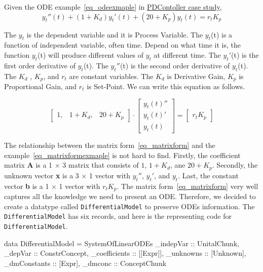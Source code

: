 Given the ODE example~\ref{eq_odeexmaple} in \href{https://jacquescarette.github.io/Drasil/examples/pdcontroller/SRS/srs/PDController_SRS.html}{PDContoller case study},
\begin{equation} \label{eq_odeexmaple}
	y_t''(t) + (1 + K_d)y_t'(t) + (20 + K_p)y_t(t) = r_t K_p
\end{equation}

The $y_t$ is the dependent variable and it is Process Variable. The $y_t$(t) is a function of independent variable, often time. Depend on what time it is, the function $y_t$(t) will produce different values of $y_t$ at different time. The $y_t'$(t) is the first order derivative of $y_t$(t). The $y_t''$(t) is the second order derivative of $y_t$(t). The $K_d$ , $K_p$, and $r_t$ are constant variables. The $K_d$ is Derivative Gain, $K_p$ is Proportional Gain, and $r_t$ is Set-Point. We can write this equation as follows. 

\begin{equation} \label{eq_matrixformexmaple}
	\begin{bmatrix}
		1, & 1 + K_{d}, & 20 + K_{p}
	\end{bmatrix}
	\cdot
	\begin{bmatrix}
		y_{t}(t)''  \\
		y_{t}(t)'   \\
		y_{t}(t)  
	\end{bmatrix}
	=
	\begin{bmatrix}
		r_{t} K_{p} 
	\end{bmatrix}
\end{equation}

The relationship between the matrix form~\ref{eq_matrixform} and the example~\ref{eq_matrixformexmaple} is not hard to find. Firstly, the coefficient matrix \textbf{A} is a 1 $\times$ 3 matrix that consists of $1$, $1 + K_d$, ane $20 + K_p$. Secondly, the unknown vector \textbf{x} is a 3 $\times$ 1 vector with $y_t''$, $y_t'$, and $y_t$. Last, the constant vector \textbf{b} is a 1 $\times$ 1 vector with $r_t K_p$. The matrix form~\ref{eq_matrixform} very well captures all the knowledge we need to present an ODE. Therefore, we decided to create a datatype called \verb|DifferentialModel| to preserve ODEs information. The \verb|DifferentialModel| has six records, and here is the representing code for \verb|DifferentialModel|.
\begin{haskell1}
data DifferentialModel = SystemOfLinearODEs {
	_indepVar :: UnitalChunk,
	_depVar :: ConstrConcept,
	_coefficients :: [[Expr]],
	_unknowns :: [Unknown],
	_dmConstants :: [Expr],
	_dmconc :: ConceptChunk
}
\end{haskell1}

